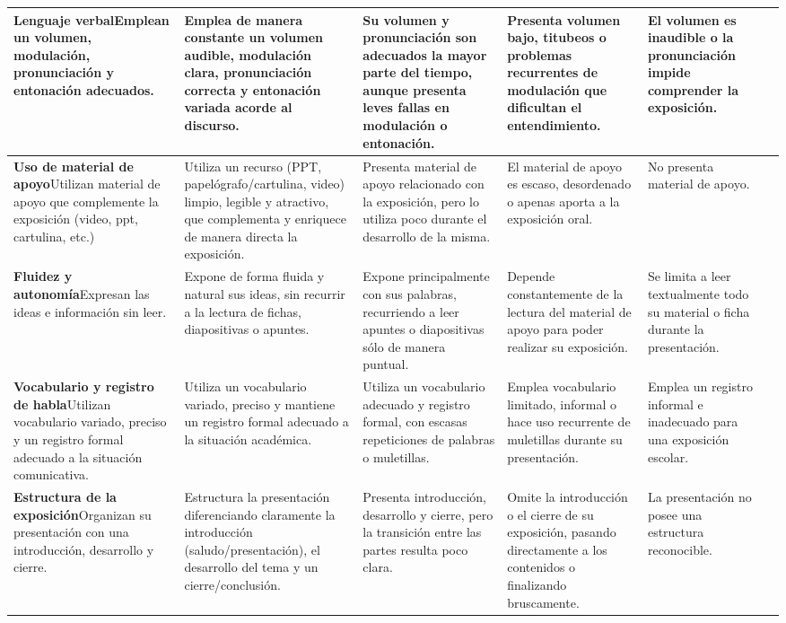 \documentclass[9pt]{extarticle}
\newcommand{\crit}[2]{\textbf{#1}\newline #2}
\begin{document}
\begin{longtable}{|C{4.9cm}|C{4.45cm}|C{4.45cm}|C{4.45cm}|C{4.45cm}|>{\centering\arraybackslash}p{1.55cm}|}
\crit{Lenguaje verbal}{Emplean un volumen, modulación, pronunciación y entonación adecuados.}
& Emplea de manera constante un volumen audible, modulación clara, pronunciación correcta y entonación variada acorde al discurso.
& Su volumen y pronunciación son adecuados la mayor parte del tiempo, aunque presenta leves fallas en modulación o entonación.
& Presenta volumen bajo, titubeos o problemas recurrentes de modulación que dificultan el entendimiento.
& El volumen es inaudible o la pronunciación impide comprender la exposición.
& \\ \hline

\crit{Uso de material de apoyo}{Utilizan material de apoyo que complemente la exposición (video, ppt, cartulina, etc.)}
& Utiliza un recurso (PPT, papelógrafo/cartulina, video) limpio, legible y atractivo, que complementa y enriquece de manera directa la exposición.
& Presenta material de apoyo relacionado con la exposición, pero lo utiliza poco durante el desarrollo de la misma.
& El material de apoyo es escaso, desordenado o apenas aporta a la exposición oral.
& No presenta material de apoyo.
& \\ \hline

\crit{Fluidez y autonomía}{Expresan las ideas e información sin leer.}
& Expone de forma fluida y natural sus ideas, sin recurrir a la lectura de fichas, diapositivas o apuntes.
& Expone principalmente con sus palabras, recurriendo a leer apuntes o diapositivas sólo de manera puntual.
& Depende constantemente de la lectura del material de apoyo para poder realizar su exposición.
& Se limita a leer textualmente todo su material o ficha durante la presentación.
& \\ \hline

\crit{Vocabulario y registro de habla}{Utilizan vocabulario variado, preciso y un registro formal adecuado a la situación comunicativa.}
& Utiliza un vocabulario variado, preciso y mantiene un registro formal adecuado a la situación académica.
& Utiliza un vocabulario adecuado y registro formal, con escasas repeticiones de palabras o muletillas.
& Emplea vocabulario limitado, informal o hace uso recurrente de muletillas durante su presentación.
& Emplea un registro informal e inadecuado para una exposición escolar.
& \\ \hline

\crit{Estructura de la exposición}{Organizan su presentación con una introducción, desarrollo y cierre.}
& Estructura la presentación diferenciando claramente la introducción (saludo/presentación), el desarrollo del tema y un cierre/conclusión.
& Presenta introducción, desarrollo y cierre, pero la transición entre las partes resulta poco clara.
& Omite la introducción o el cierre de su exposición, pasando directamente a los contenidos o finalizando bruscamente.
& La presentación no posee una estructura reconocible.
& \\ \hline


\end{longtable}
\end{document}
